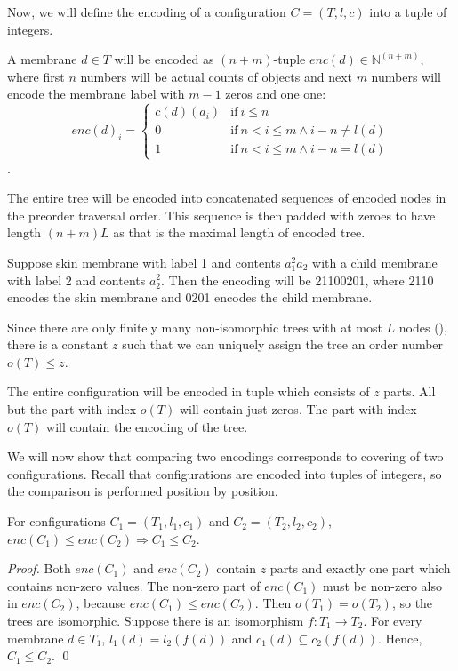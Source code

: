 \documentclass[llncs,submission,copyright,creativecommons]{../lib/lncs/llncs}
\begin{document}
Now, we will define the encoding of a configuration $C = (T, l, c)$ into a tuple of integers.

A membrane $d\in T$ will be encoded as $(n+m)$-tuple $enc(d)\in\mathbb N^{(n+m)}$, where first $n$ numbers will be actual counts of objects and next $m$ numbers will encode the membrane label with $m-1$ zeros and one one:
\[
  enc(d)_{i} =
  \begin{cases}
    c(d)(a_i) & \text{if}\ i\leq n\\
    0 & \text{if}\ n<i\leq m\wedge i-n\neq l(d)\\
    1 & \text{if}\ n<i\leq m\wedge i-n=l(d)
  \end{cases}
\].

The entire tree will be encoded into concatenated sequences of encoded nodes in the preorder traversal order. This sequence is then padded with zeroes to have length $(n+m)L$ as that is the maximal length of encoded tree.

\begin{example}
  Suppose skin membrane with label 1 and contents $a_1^2a_2$ with a child membrane with label 2 and contents $a_2^2$. Then the encoding will be 21100201, where 2110 encodes the skin membrane and 0201 encodes the child membrane.
\end{example} 

Since there are only finitely many non-isomorphic trees with at most $L$ nodes (\cite{Cayley1881RootedTrees}), there is a constant $z$ such that we can uniquely assign the tree an order number $o(T) \leq z$.

The entire configuration will be encoded in tuple which consists of $z$ parts. All but the part with index $o(T)$ will contain just zeros. The part with index $o(T)$ will contain the encoding of the tree.

We will now show that comparing two encodings corresponds to covering of two configurations. Recall that configurations are encoded into tuples of integers, so the comparison is performed position by position.

\begin{lemma}
\label{encoding_lemma}
  For configurations $C_1 = (T_1, l_1, c_1)$ and $C_2 = (T_2, l_2, c_2)$, $enc(C_1) \leq enc(C_2)\Rightarrow C_1\leq C_2$.
\end{lemma}

\begin{proof}
  Both $enc(C_1)$ and $enc(C_2)$ contain $z$ parts and exactly one part which contains non-zero values. The non-zero part of $enc(C_1)$ must be non-zero also in $enc(C_2)$, because $enc(C_1)\leq enc(C_2)$. Then $o(T_1)=o(T_2)$, so the trees are isomorphic. Suppose there is an isomorphism $f:T_1\rightarrow T_2$. For every membrane $d\in T_1$, $l_1(d)=l_2(f(d))$ and $c_1(d)\subseteq c_2(f(d))$. Hence, $C_1\leq C_2$.
  \qed
\end{proof}
\end{document}

